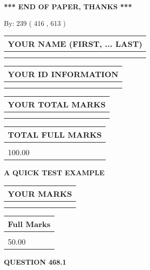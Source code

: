 \documentclass[12pt]{article}
\begin{document}
\vspace{1.0in} 
{\textbf{\large{ *** END OF PAPER, THANKS *** }}} 
   
   
\hspace{1.0in} By: 
 239 ( 416 ,  613 )
   
   
   
   
\newpage 
\setcounter{page}{ 
   468001 } 
   
   
   
   
\noindent\begin{tabular}{|l|}
\hline
YOUR NAME (FIRST, ... LAST)  \\
\hline
 \\ 
 \\ 
\hline
\end{tabular}
\hspace{0.05in} \begin{tabular}{|l|}
\hline
 YOUR   ID   INFORMATION  \\
\hline
 \\ 
 \\ 
\hline
\end{tabular}
   
   
\vspace{0.2in}\noindent\begin{tabular}{|l|}
\hline
YOUR TOTAL MARKS  \\
\hline
 \\ 
 \\ 
\hline
\end{tabular}
\hspace{0.05in} \begin{tabular}{|l|}
\hline
TOTAL FULL MARKS  \\
\hline
 \\ 
100.00 \\
\hline
\end{tabular}
   
   
 \vspace{0.2in}
{\LARGE {\textbf{ A QUICK TEST EXAMPLE}}}
   
   
  
\vspace{0.2in}
  
\noindent\begin{tabular}{|l|}
\hline
 YOUR MARKS  \\
\hline
 \\ 
 \\ 
\hline
\end{tabular}
\hspace{0.05in} \begin{tabular}{|l|}
\hline
 Full Marks  \\
\hline
 \\ 
50.00 \\
\hline
\end{tabular}
{\textbf{\Large{QUESTION
468.1 
}}}
  
\end{document}
